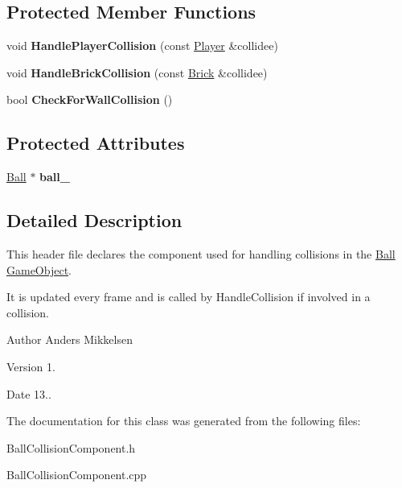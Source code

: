 \subsection*{Protected Member Functions}
\begin{DoxyCompactItemize}
\item 
\hypertarget{class_ball_collision_component_a9837dc881118a8301c12fe3e84eef29c}{}void {\bfseries Handle\+Player\+Collision} (const \hyperlink{class_player}{Player} \&collidee)\label{class_ball_collision_component_a9837dc881118a8301c12fe3e84eef29c}

\item 
\hypertarget{class_ball_collision_component_a1f582b16fc10e8c23245ce6a204c316d}{}void {\bfseries Handle\+Brick\+Collision} (const \hyperlink{class_brick}{Brick} \&collidee)\label{class_ball_collision_component_a1f582b16fc10e8c23245ce6a204c316d}

\item 
\hypertarget{class_ball_collision_component_a609fe70bf85ba2c9b28d2812cc036892}{}bool {\bfseries Check\+For\+Wall\+Collision} ()\label{class_ball_collision_component_a609fe70bf85ba2c9b28d2812cc036892}

\end{DoxyCompactItemize}
\subsection*{Protected Attributes}
\begin{DoxyCompactItemize}
\item 
\hypertarget{class_ball_collision_component_a0dbf72b26b0ee1311f94fb3aae543f98}{}\hyperlink{class_ball}{Ball} $\ast$ {\bfseries ball\+\_\+}\label{class_ball_collision_component_a0dbf72b26b0ee1311f94fb3aae543f98}

\end{DoxyCompactItemize}


\subsection{Detailed Description}
This header file declares the component used for handling collisions in the \hyperlink{class_ball}{Ball} \hyperlink{class_game_object}{Game\+Object}. 

It is updated every frame and is called by Handle\+Collision if involved in a collision.

\begin{DoxyAuthor}{Author}
Anders Mikkelsen 
\end{DoxyAuthor}
\begin{DoxyVersion}{Version}
1. 
\end{DoxyVersion}
\begin{DoxyDate}{Date}
13.. 
\end{DoxyDate}


The documentation for this class was generated from the following files\+:\begin{DoxyCompactItemize}
\item 
Ball\+Collision\+Component.\+h\item 
Ball\+Collision\+Component.\+cpp\end{DoxyCompactItemize}
